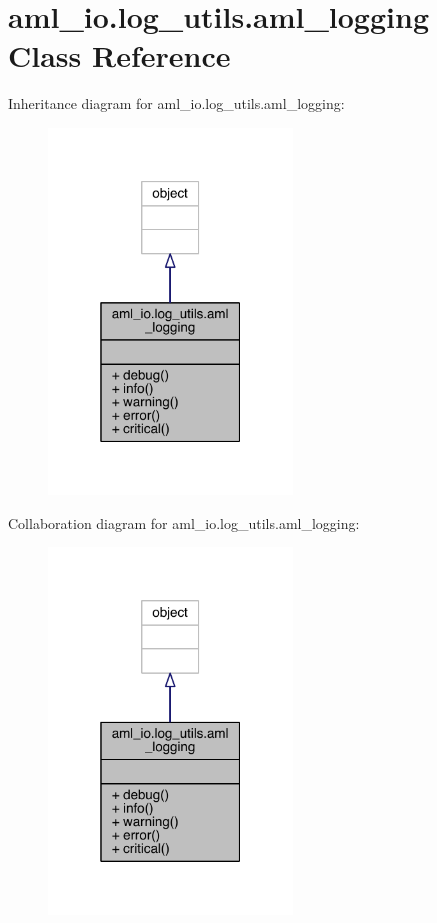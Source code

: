 \hypertarget{classaml__io_1_1log__utils_1_1aml__logging}{}\section{aml\+\_\+io.\+log\+\_\+utils.\+aml\+\_\+logging Class Reference}
\label{classaml__io_1_1log__utils_1_1aml__logging}


Inheritance diagram for aml\+\_\+io.\+log\+\_\+utils.\+aml\+\_\+logging\+:
\nopagebreak
\begin{figure}[H]
\begin{center}
\leavevmode
\includegraphics[width=184pt]{classaml__io_1_1log__utils_1_1aml__logging__inherit__graph}
\end{center}
\end{figure}


Collaboration diagram for aml\+\_\+io.\+log\+\_\+utils.\+aml\+\_\+logging\+:
\nopagebreak
\begin{figure}[H]
\begin{center}
\leavevmode
\includegraphics[width=184pt]{classaml__io_1_1log__utils_1_1aml__logging__coll__graph}
\end{center}
\end{figure}
